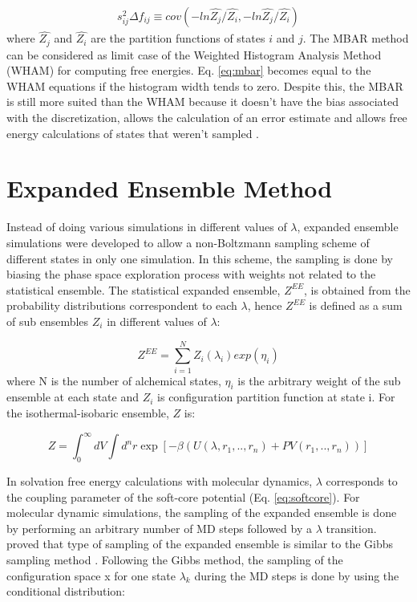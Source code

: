 	\begin{equation}
	\label{eq:varmbar}
	\begin{aligned}
	s_{ij}^{2} \Delta f_{ij} \equiv cov (-ln \hat{Z_{j}}/\hat{Z_{i}},-ln \hat{Z_{j}}/\hat{Z_{i}})
	\end{aligned}
	\end{equation}
	where $\hat{Z_{j}}$ and $\hat{Z_{i}}$ are the partition functions of states $i$ and $j$. The MBAR method can be considered as limit case of the 
	Weighted Histogram Analysis Method (WHAM) \cite{wham} for computing free energies. Eq. \eqref{eq:mbar} becomes equal to the WHAM equations if the histogram width tends to zero. Despite this, the MBAR is still more suited than the WHAM because it doesn't have the bias associated with the discretization, allows the calculation of an error estimate and allows free energy calculations of states that weren't sampled \cite{mbar}.
	
\section{Expanded Ensemble Method}\label{ee}
	
	Instead of doing various simulations in different values of $\lambda$, expanded ensemble simulations \cite{lyubartsev} were developed to allow a non-Boltzmann sampling scheme of different states in only one simulation. In this scheme, the sampling is done by biasing the phase space exploration process with weights not related to the statistical ensemble. The statistical expanded ensemble, $Z^{EE}$, is obtained from the probability distributions correspondent to each $\lambda$, hence $Z^{EE}$ is defined as a sum of sub ensembles $Z_{i}$ in different values of $\lambda$:
	
	\begin{equation}
	Z^{EE} = \sum_{i=1}^{N} Z_{i}(\lambda_{i}) exp(\eta_{i})
	\label{eqn:ee}
	\end{equation}   
	where N is the number of alchemical states, $\eta_{i}$ is the arbitrary weight of the sub ensemble at each state and $Z_{i}$ is configuration partition function at state i. For the isothermal-isobaric ensemble, $Z$ is:
	
	\begin{equation}
	Z = {\int_{0}^{\infty} dV \int d^{n}r \exp \left[ -\beta \left(U(\lambda, r_{1},..,r_{n}) + PV(r_{1},..,r_{n}) \right) \right]}
	\end{equation} 
	
	In solvation free energy calculations with molecular dynamics, $\lambda$ corresponds to the coupling parameter of the soft-core potential (Eq. \ref{eq:softcore}). For molecular dynamic simulations, the sampling of the expanded ensemble is done by performing an arbitrary number of MD  steps followed by a $\lambda$ transition.  proved that type of sampling of the expanded ensemble is similar to the Gibbs sampling method \cite{geman1984,liu2002}. Following the Gibbs method, the sampling of the configuration space x for one state $\lambda_{k}$ during the MD steps is done by using the conditional distribution:
	
